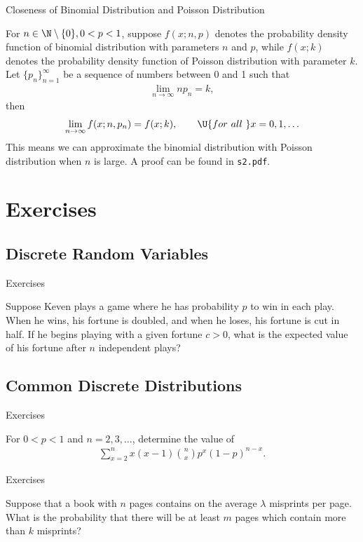 \begin{frame}{Closeness of Binomial Distribution and Poisson Distribution}

\justifying
{} For $n\in \N\setminus\{0\}, 0 < p < 1$, suppose $f(x; n, p)$ denotes the probability density function of binomial distribution with parameters $n$ and $p$, while $f(x; k)$ denotes the probability density function of Poisson distribution with parameter $k$. Let $\{p_n\}_{n=1}^{\infty}$ be a sequence of numbers between 0 and 1 such that
\begin{align*}
\lim_{n\rightarrow\infty} np_n = k,
\end{align*}
then
\begin{align*}
\lim_{n\rightarrow \infty} f(x; n, p_n) = f(x; k), \qquad \U{for\ all\ } x = 0, 1, \ldots
\end{align*}
This means we can approximate the binomial distribution with Poisson distribution when $n$ is large. A proof can be found in \texttt{s2.pdf}.

\end{frame}


\section{Exercises}

\subsection{Discrete Random Variables}

\begin{frame}{Exercises}

\justifying
{} Suppose Keven plays a game where he has probability $p$ to win in each play. When he wins, his fortune is doubled, and when he loses, his fortune is cut in half. If he begins playing with a given fortune $c > 0$, what is the expected value of his fortune after $n$ independent plays?

\end{frame}

\subsection{Common Discrete Distributions}


\begin{frame}{Exercises}

\justifying
{} For $0 < p < 1$ and $n = 2, 3, \ldots$, determine the value of
\begin{align*}
\sum_{x=2}^n x(x-1)\binom{n}{x} p^x(1-p)^{n-x}.
\end{align*}

\end{frame}


\begin{frame}{Exercises}

\justifying
{} Suppose that a book with $n$ pages contains on the average $\lambda$ misprints per page. What is the probability that there will be at least $m$ pages which contain more than $k$ misprints?

\end{frame}

